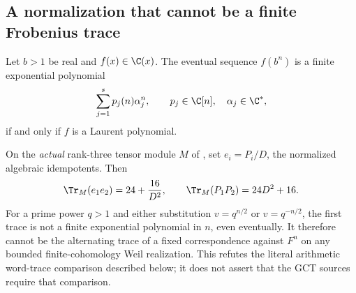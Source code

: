 \subsection{A normalization that cannot be a finite Frobenius trace}
\begin{finding}\label{f:normalizedtrace}
Let $b>1$ be real and $f(x)\in\C(x)$. The eventual sequence $f(b^n)$ is
a finite exponential polynomial
\[
 \sum_{j=1}^s p_j(n)\alpha_j^n,
 \qquad p_j\in\C[n],\quad \alpha_j\in\C^*,
\]
if and only if $f$ is a Laurent polynomial.

On the \emph{actual} rank-three tensor module $M$ of , set
$e_i=P_i/D$, the normalized algebraic idempotents. Then
\[
 \Tr_M(e_1e_2)=24+\frac{16}{D^2},\qquad
 \Tr_M(P_1P_2)=24D^2+16.
\]
For a prime power $q>1$ and either substitution $v=q^{n/2}$ or $v=q^{-n/2}$, the first trace
is not a finite exponential polynomial in $n$, even eventually.
It therefore cannot be the alternating trace of a fixed correspondence
against $F^n$ on any bounded finite-cohomology Weil realization.
This refutes the literal arithmetic word-trace comparison described
below; it does not assert that the GCT sources require that comparison.
\end{finding}
